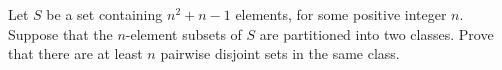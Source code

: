 Let $S$ be a set containing $n^{2}+n-1$ elements, for some positive integer $n$. Suppose that the $n$-element subsets of $S$ are partitioned into two classes. Prove that there are at least $n$ pairwise disjoint sets in the same class.